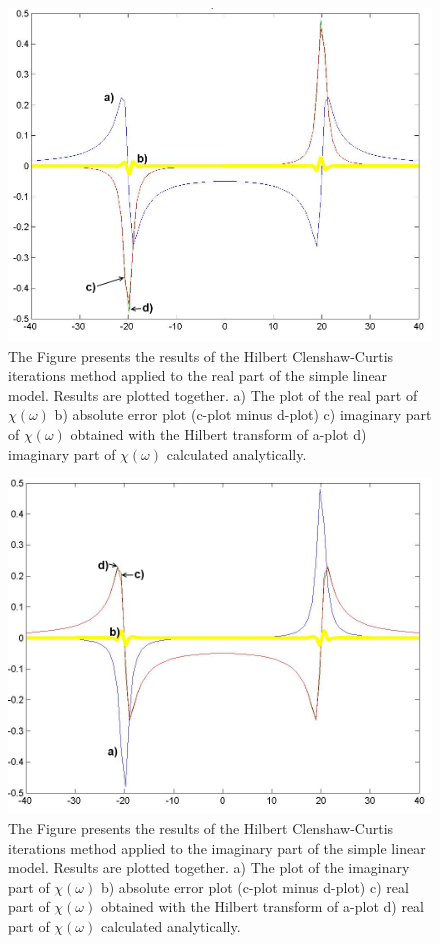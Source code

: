\documentclass[12pt,twoside,a4paper]{article}
\numberwithin{equation}{subsection}
\numberwithin{figure}{subsection}
\begin{document}
\begin{figure} 
  \includegraphics[width=150mm]{img/hcc_lin1.png}
  \caption{The Figure presents the results of the Hilbert Clenshaw-Curtis iterations method applied to the real part of the simple linear model. Results are plotted together.
   a) The plot of the real part of $\chi (\omega )$ 
   b) absolute error plot (c-plot minus d-plot) 
   c) imaginary part of $\chi (\omega )$ obtained with the Hilbert transform of a-plot 
   d) imaginary part of $\chi (\omega )$  calculated analytically. \label{fig:cci_lin1}
  }
\end{figure}

\begin{figure} 
  \includegraphics[width=150mm]{img/hcc_lin2.png}
  \caption{The Figure presents the results of the Hilbert Clenshaw-Curtis iterations method applied to the imaginary part of the simple linear model. Results are plotted together.
   a) The plot of the imaginary part of $\chi (\omega )$ 
   b) absolute error plot (c-plot minus d-plot) 
   c) real part of $\chi (\omega )$ obtained with the Hilbert transform of a-plot 
   d) real part of $\chi (\omega )$ calculated analytically. \label{fig:cci_lin2}
  }
\end{figure}
\end{document}
